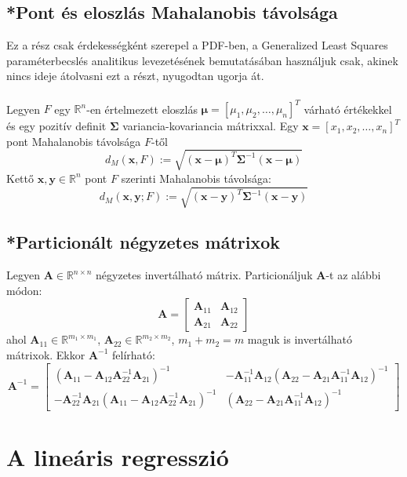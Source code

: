 \documentclass[14p]{report}
\def\pmb{\boldsymbol}
\begin{document}
	\section{*Pont és eloszlás Mahalanobis távolsága}
	Ez a rész csak érdekességként szerepel a PDF-ben, a Generalized Least Squares paraméterbecslés analitikus levezetésének bemutatásában használjuk csak, akinek nincs ideje átolvasni ezt a részt, nyugodtan ugorja át.
	\\
	\\
	Legyen $F$ egy $\mathbb{R}^{n}$-en értelmezett eloszlás $\pmb{\mu} = [\mu_1, \mu_2, \dots, \mu_n]^T$ várható értékekkel és egy pozitív definit $\pmb{\Sigma}$ variancia-kovariancia mátrixxal. Egy $\pmb{x} = [x_1, x_2, \dots, x_n]^T$ pont Mahalanobis távolsága $F$-től
	\[
		d_M(\pmb{x}, F) := \sqrt{(\pmb{x} - \pmb{\mu})^T\pmb{\Sigma}^{-1}(\pmb{x} - \pmb{\mu})}
	\]
	Kettő $\pmb{x}, \pmb{y} \in \mathbb{R}^n$ pont $F$ szerinti Mahalanobis távolsága:
	\[
		d_M(\pmb{x}, \pmb{y}; F) := \sqrt{(\pmb{x} - \pmb{y})^T\pmb{\Sigma}^{-1}(\pmb{x} - \pmb{y})}
	\]
	\section{*Particionált négyzetes mátrixok}
	Legyen $\pmb{A} \in \mathbb{R}^{n \times n}$ négyzetes invertálható mátrix. Particionáljuk $\pmb{A}$-t az alábbi módon:
	\[
		\pmb{A} =
		\begin{bmatrix}
		\pmb{A}_{11} & \pmb{A}_{12} \\
		\pmb{A}_{21} & \pmb{A}_{22}
		\end{bmatrix}
	\]
	ahol $\pmb{A}_{11} \in \mathbb{R}^{m_1 \times m_1}$, $\pmb{A}_{22} \in \mathbb{R}^{m_2 \times m_2}$, $m_1 + m_2 = m$ maguk is invertálható mátrixok. Ekkor $\pmb{A}^{-1}$ felírható:
	\[
		\pmb{A}^{-1} = 
		\begin{bmatrix}
		(\pmb{A}_{11}-\pmb{A}_{12}\pmb{A}_{22}^{-1}\pmb{A}_{21})^{-1} & -\pmb{A}_{11}^{-1}\pmb{A}_{12}(\pmb{A}_{22}-\pmb{A}_{21}\pmb{A}_{11}^{-1}\pmb{A}_{12})^{-1} \\
		-\pmb{A}_{22}^{-1}\pmb{A}_{21}(\pmb{A}_{11}-\pmb{A}_{12}\pmb{A}_{22}^{-1}\pmb{A}_{21})^{-1} & (\pmb{A}_{22}-\pmb{A}_{21}\pmb{A}_{11}^{-1}\pmb{A}_{12})^{-1}
		\end{bmatrix}
	\]
	
	
	\chapter{A lineáris regresszió}
\end{document}
